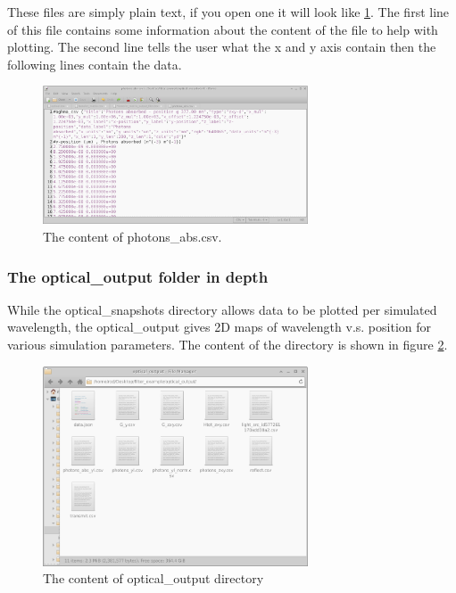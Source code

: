 These files are simply plain text, if you open one it will look like \ref{fig:transfer_matrix_file_example}. The first line of this file contains some information about the content of the file to help with plotting. The second line tells the user what the x and y axis contain then the following lines contain the data.

\begin{figure}[H]
\centering
\includegraphics[height=0.5\textwidth,width=0.7\textwidth]{./images/transfer_matrix/snapshots_file_example.png}
\caption{The content of photons\_abs.csv.}
\label{fig:transfer_matrix_file_example}
\end{figure}

\subsubsection{The optical\_output folder in depth}
While the optical\_snapshots directory allows data to be plotted per simulated wavelength, the optical\_output gives 2D maps of wavelength v.s. position for various simulation parameters. The content of the directory is shown in figure \ref{fig:optical_output_directory}.

\begin{figure}[H]
\centering
\includegraphics[height=0.5\textwidth,width=0.7\textwidth]{./images/transfer_matrix/optical_output_dir.png}
\caption{The content of optical\_output directory}
\label{fig:optical_output_directory}
\end{figure}

